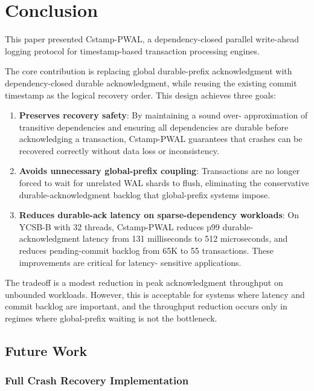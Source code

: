 \section{Conclusion}
\label{sec:conclusion}

This paper presented Cstamp-PWAL, a dependency-closed parallel write-ahead
logging protocol for timestamp-based transaction processing engines.

The core contribution is replacing global durable-prefix acknowledgment with
dependency-closed durable acknowledgment, while reusing the existing commit
timestamp as the logical recovery order.  This design achieves three goals:

\begin{enumerate}

\item \textbf{Preserves recovery safety}: By maintaining a sound over-
approximation of transitive dependencies and ensuring all dependencies are
durable before acknowledging a transaction, Cstamp-PWAL guarantees that crashes
can be recovered correctly without data loss or inconsistency.

\item \textbf{Avoids unnecessary global-prefix coupling}: Transactions are no
longer forced to wait for unrelated WAL shards to flush, eliminating the
conservative durable-acknowledgment backlog that global-prefix systems impose.

\item \textbf{Reduces durable-ack latency on sparse-dependency workloads}: On
YCSB-B with 32 threads, Cstamp-PWAL reduces p99 durable-acknowledgment latency
from 131 milliseconds to 512 microseconds, and reduces pending-commit backlog
from 65K to 55 transactions.  These improvements are critical for latency-
sensitive applications.

\end{enumerate}

The tradeoff is a modest reduction in peak acknowledgment throughput on
unbounded workloads.  However, this is acceptable for systems where latency and
commit backlog are important, and the throughput reduction occurs only in
regimes where global-prefix waiting is not the bottleneck.

\subsection{Future Work}

\subsubsection{Full Crash Recovery Implementation}

